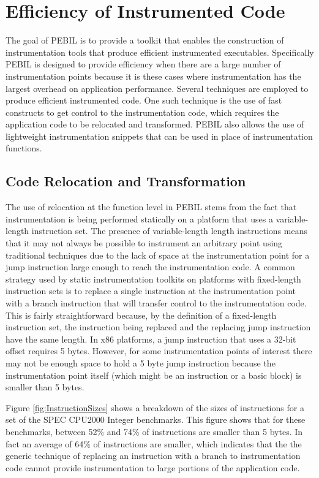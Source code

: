 \section{Efficiency of Instrumented Code}
\label{sec:Efficiency}

The goal of PEBIL is to provide a toolkit that enables the construction of
instrumentation tools that produce efficient instrumented executables.
Specifically PEBIL is designed to provide efficiency when there are a large
number of instrumentation points because it is these cases where instrumentation
has the largest overhead on application performance. Several techniques are
employed to produce efficient instrumented code. One such technique is the use
of fast constructs to get control to the instrumentation code, which requires
the application code to be relocated and transformed. PEBIL also allows the use
of lightweight instrumentation snippets that can be used in place of
instrumentation functions.

\subsection{Code Relocation and Transformation}
\label{Subsection:Relocation}
The use of relocation at the function level in PEBIL stems from the fact that
instrumentation is being performed statically on a platform that uses a
variable-length instruction set. The presence of variable-length length
instructions means that it may not always be possible to instrument an arbitrary
point using traditional techniques due to the lack of space at the
instrumentation point for a jump instruction large enough to reach the
instrumentation code. A common strategy used by static instrumentation toolkits
on platforms with fixed-length instruction sets is to replace a single
instruction at the instrumentation point with a branch instruction that will
transfer control to the instrumentation code. This is fairly straightforward
because, by the definition of a fixed-length instruction set, the instruction
being replaced and the replacing jump instruction have the same length. In x86
platforms, a jump instruction that uses a 32-bit offset requires 5 bytes.
However, for some instrumentation points of interest there may not be enough
space to hold a 5 byte jump instruction because the instrumentation point itself
(which might be an instruction or a basic block) is smaller than 5 bytes. 

Figure \ref{fig:InstructionSizes} shows a breakdown of the sizes of instructions
for a set of the SPEC CPU2000 Integer benchmarks. This figure shows that for
these benchmarks, between 52\% and 74\% of instructions are smaller than 5
bytes. In fact an average of 64\% of instructions are smaller, which indicates
that the the generic technique of replacing an instruction with a branch to
instrumentation code cannot provide instrumentation to large portions of the application
code.

